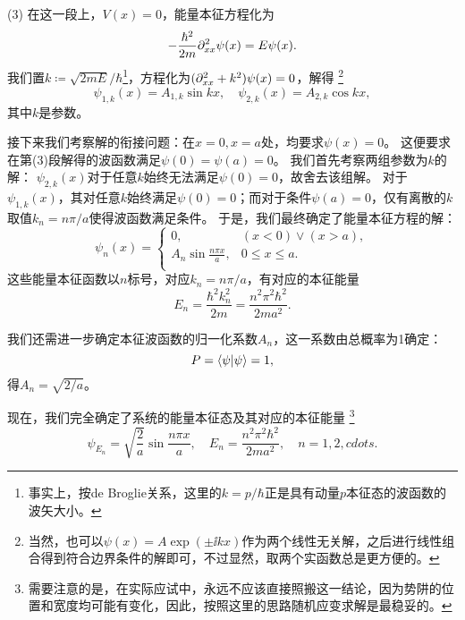 (3) 在这一段上，$V(x)=0$，能量本征方程化为
\begin{equation}
    -\frac{\hbar^2}{2m} \partial_{xx}^2 \psi(x) = E \psi(x).
\end{equation}
我们置$k\coloneq \sqrt{2mE}/\hbar$\footnote{事实上，按de Broglie关系，这里的$k=p/\hbar$正是具有动量$p$本征态的波函数的波矢大小。}，方程化为$(\partial_{xx}^2+k^2) \psi(x) = 0$，解得
\footnote{当然，也可以$\psi(x)=A\exp(\pm\ii k x)$作为两个线性无关解，之后进行线性组合得到符合边界条件的解即可，不过显然，取两个实函数总是更方便的。}
\begin{equation}
    \psi_{1,k}(x) = A_{1,k} \sin kx ,\quad \psi_{2,k}(x) = A_{2,k} \cos kx,
\end{equation}
其中$k$是参数。

接下来我们考察解的衔接问题：在$x=0, x=a$处，均要求$\psi(x)=0$。
这便要求在第(3)段解得的波函数满足$\psi(0)=\psi(a)=0$。
我们首先考察两组参数为$k$的解：
$\psi_{2,k}(x)$对于任意$k$始终无法满足$\psi(0)=0$，故舍去该组解。
对于$\psi_{1,k}(x)$，其对任意$k$始终满足$\psi(0)=0$；而对于条件$\psi(a)=0$，仅有离散的$k$取值$k_n=n\pi/a$使得波函数满足条件。
于是，我们最终确定了能量本征方程的解：
\begin{equation}
    \psi_n(x) =
    \begin{cases}
        0,                          & (x<0)\vee(x>a),  \\
        A_n \sin\frac{n\pi x}{a},   & 0 \leq x \leq a.\\
    \end{cases}
\end{equation}
这些能量本征函数以$n$标号，对应$k_n=n\pi/a$，有对应的本征能量
\begin{equation}
    E_n = \frac{\hbar^2 k_n^2}{2m} = \frac{n^2 \pi^2 \hbar^2}{2m a^2}.
\end{equation}

我们还需进一步确定本征波函数的归一化系数$A_n$，这一系数由总概率为1确定：
\begin{equation}
    P = \braket{\psi}{\psi} = 1,
\end{equation}
得$A_n = \sqrt{2/a}$。

现在，我们完全确定了系统的能量本征态及其对应的本征能量
\footnote{需要注意的是，在实际应试中，永远不应该直接照搬这一结论，因为势阱的位置和宽度均可能有变化，因此，按照这里的思路随机应变求解是最稳妥的。}
\begin{equation}
    \psi_{E_n} = \sqrt{\frac2a} \sin\frac{n\pi x}{a} ,\quad E_n = \frac{n^2 \pi^2 \hbar^2}{2m a^2}, \quad n=1,2,cdots.
\end{equation}

